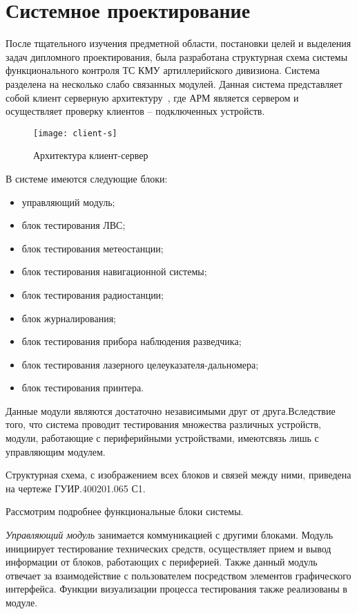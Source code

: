 \section{Системное проектирование}
\label{sec:arch}

После тщательного изучения предметной области, постановки целей и выделения задач дипломного проектирования, была
разработана структурная схема системы функционального контроля ТС КМУ артиллерийского дивизиона.
Система разделена на несколько слабо связанных модулей.
Данная система представляет собой клиент серверную архитектуру~\cite{cl_s},
где АРМ является сервером и осуществляет проверку клиентов -- подключенных устройств.

\begin{figure}[ht]
	\centering
	\texttt{[image: client-s]}
	\caption{Архитектура клиент-сервер~\cite{cl_s}}
	\label{fig:sec_arch:client}
\end{figure}

В системе имеются следующие блоки:
\begin{itemize}
	\item управляющий модуль;
	\item блок тестирования ЛВС;
	\item блок тестирования метеостанции;
	\item блок тестирования навигационной системы;
	\item блок тестирования радиостанции;
	\item блок журналирования;
	\item блок тестирования прибора наблюдения разведчика;
	\item блок тестирования лазерного целеуказателя-дальномера;
	\item блок тестирования принтера.
\end{itemize}

Данные модули являются достаточно независимыми друг от друга.\break Вследствие того, что система проводит тестирования
множества различных
устройств, модули, работающие с периферийными устройствами, имеют\break связь лишь с управляющим модулем.

Структурная схема, с изображением всех блоков и связей между ними, приведена на чертеже ГУИР.400201.065 С1.

Рассмотрим подробнее функциональные блоки системы.

\textit{Управляющий модуль} занимается коммуникацией с другими блоками. Модуль инициирует тестирование технических
средств, осуществляет прием и вывод информации от блоков, работающих с периферией. Также данный модуль отвечает за
взаимодействие с пользователем посредством элементов графического интерфейса. Функции визуализации процесса тестирования
также реализованы в модуле.

